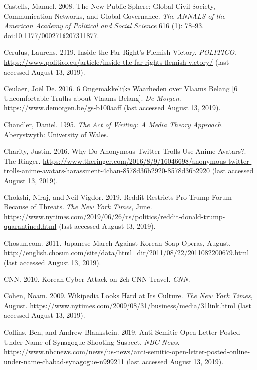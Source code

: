 \documentclass[10pt,british,A4paper,twoside]{memoir}
\begin{document}
\hypertarget{ref-castells_new_2008}{}
Castells, Manuel. 2008. The New Public Sphere: Global Civil Society,
Communication Networks, and Global Governance. \emph{The ANNALS of the
American Academy of Political and Social Science} 616 (1): 78--93.
doi:\href{https://doi.org/10.1177/0002716207311877}{10.1177/0002716207311877}.

\hypertarget{ref-cerulus_inside_2019}{}
Cerulus, Laurens. 2019. Inside the Far Right's Flemish Victory.
\emph{POLITICO}.
\url{https://www.politico.eu/article/inside-the-far-rights-flemish-victory/} (last accessed August 13, 2019).

\hypertarget{ref-ceulaer_6_2016}{}
Ceulaer, Joël De. 2016. 6 Ongemakkelijke Waarheden over Vlaams Belang [6 Uncomfortable Truths about Vlaams Belang].
\emph{De Morgen}. \url{https://www.demorgen.be/gs-b100aaff} (last accessed August 13, 2019).

\hypertarget{ref-chandler_act_1995}{}
Chandler, Daniel. 1995. \emph{The Act of Writing: A Media Theory
Approach}. Aberystwyth: University of Wales.

\hypertarget{ref-charity_why_2016}{}
Charity, Justin. 2016. Why Do Anonymous Twitter Trolls Use Anime Avatars?. The Ringer.
\url{https://www.theringer.com/2016/8/9/16046698/anonymous-twitter-trolls-anime-avatars-harassment-4chan-8578d36b2920-8578d36b2920} (last accessed August 13, 2019).

\hypertarget{ref-chokshi_reddit_2019}{}
Chokshi, Niraj, and Neil Vigdor. 2019. Reddit Restricts Pro-Trump Forum
Because of Threats. \emph{The New York Times}, June.
\url{https://www.nytimes.com/2019/06/26/us/politics/reddit-donald-trump-quarantined.html} (last accessed August 13, 2019).

\hypertarget{ref-chosun.com_japanese_2011}{}
Chosun.com. 2011. Japanese March Against Korean Soap Operas, August.
\url{http://english.chosun.com/site/data/html_dir/2011/08/22/2011082200679.html} (last accessed August 13, 2019).

\hypertarget{ref-cnn_korean_2010}{}
CNN. 2010. Korean Cyber Attack on 2ch CNN Travel.
\emph{CNN}.

\hypertarget{ref-cohen_wikipedia_2009}{}
Cohen, Noam. 2009. Wikipedia Looks Hard at Its Culture. \emph{The New
York Times}, August.
\url{https://www.nytimes.com/2009/08/31/business/media/31link.html} (last accessed August 13, 2019).

\hypertarget{ref-collins_anti-semitic_2019}{}
Collins, Ben, and Andrew Blankstein. 2019. Anti-Semitic Open Letter
Posted Under Name of Synagogue Shooting Suspect. \emph{NBC News}.
\url{https://www.nbcnews.com/news/us-news/anti-semitic-open-letter-posted-online-under-name-chabad-synagogue-n999211} (last accessed August 13, 2019).
\end{document}
